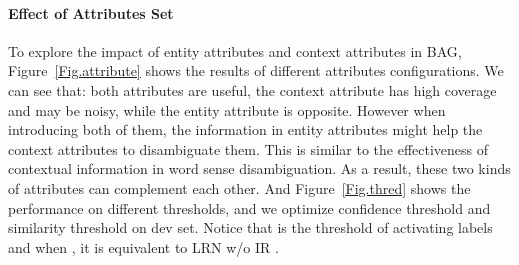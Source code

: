 \documentclass[11pt]{article}
\begin{document}
\paragraph{Effect of Attributes Set}
To explore the impact of entity attributes and context attributes in BAG, Figure~\ref{Fig.attribute} shows the results of different attributes configurations. We can see that: both attributes are useful, the context attribute has high coverage and may be noisy, while the entity attribute is opposite. However when introducing both of them, the information in entity attributes might help the context attributes to disambiguate them. This is similar to the effectiveness of contextual information in word sense disambiguation. As a result, these two kinds of attributes can complement each other. And Figure~\ref{Fig.thred} shows the performance on different thresholds, and we optimize confidence threshold  and similarity threshold  on dev set. Notice that  is the threshold of activating labels and when , it is equivalent to LRN \small w/o IR \normalsize.
\end{document}
